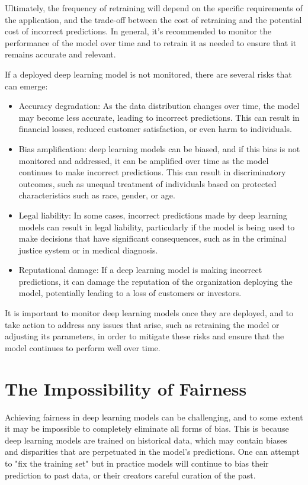 Ultimately, the frequency of retraining will depend on the specific requirements of the application, and the trade-off between the cost of retraining and the potential cost of incorrect predictions. In general, it's recommended to monitor the performance of the model over time and to retrain it as needed to ensure that it remains accurate and relevant.

If a deployed deep learning model is not monitored, there are several risks that can emerge:

\begin{itemize}
\item Accuracy degradation: As the data distribution changes over time, the model may become less accurate, leading to incorrect predictions. This can result in financial losses, reduced customer satisfaction, or even harm to individuals.
\item Bias amplification: deep learning models can be biased, and if this bias is not monitored and addressed, it can be amplified over time as the model continues to make incorrect predictions. This can result in discriminatory outcomes, such as unequal treatment of individuals based on protected characteristics such as race, gender, or age.
\item Legal liability: In some cases, incorrect predictions made by deep learning models can result in legal liability, particularly if the model is being used to make decisions that have significant consequences, such as in the criminal justice system or in medical diagnosis.
\item Reputational damage: If a deep learning model is making incorrect predictions, it can damage the reputation of the organization deploying the model, potentially leading to a loss of customers or investors.
\end{itemize}


It is important to monitor deep learning models once they are deployed, and to take action to address any issues that arise, such as retraining the model or adjusting its parameters, in order to mitigate these risks and ensure that the model continues to perform well over time.

\section{The Impossibility of Fairness}

Achieving fairness in deep learning models can be challenging, and to some extent it may be impossible to completely eliminate all forms of bias. This is because deep learning models are trained on historical data, which may contain biases and disparities that are perpetuated in the model's predictions. One can attempt to "fix the training set" but in practice models will continue to bias their prediction to past data, or their creators careful curation of the past. 

